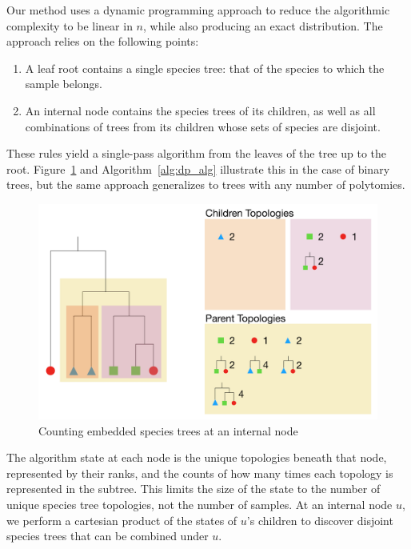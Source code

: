 \documentclass{article}
\begin{document}
Our method uses a dynamic programming approach to reduce the algorithmic
complexity to be linear in $n$, while also producing an exact distribution.
The approach relies on the following points:
\begin{enumerate}
    \item A leaf root contains a single species tree: that of the species to
        which the sample belongs.
    \item An internal node contains the species trees of its children, as
        well as all combinations of trees from its children whose
        sets of species are disjoint.
\end{enumerate}
These rules yield a single-pass algorithm from the leaves of the tree
up to the root. Figure~\ref{fig:dp_alg} and Algorithm~\ref{alg:dp_alg}
illustrate this in the case of binary trees, but the same approach generalizes
to trees with any number of polytomies.

\begin{figure}[H]
    \includegraphics[scale=0.5]{dp_alg}
    \centering
    \caption{Counting embedded species trees at an internal node}
    \label{fig:dp_alg}
\end{figure}

The algorithm state at each node is the unique topologies beneath that node,
represented by their ranks, and the
counts of how many times each topology is represented in the subtree. This
limits the size of the state to the number of unique species tree topologies,
not the number of samples. At an internal node $u$, we perform a cartesian
product of the states of $u$'s children to discover disjoint species trees that
can be combined under $u$.
\end{document}
